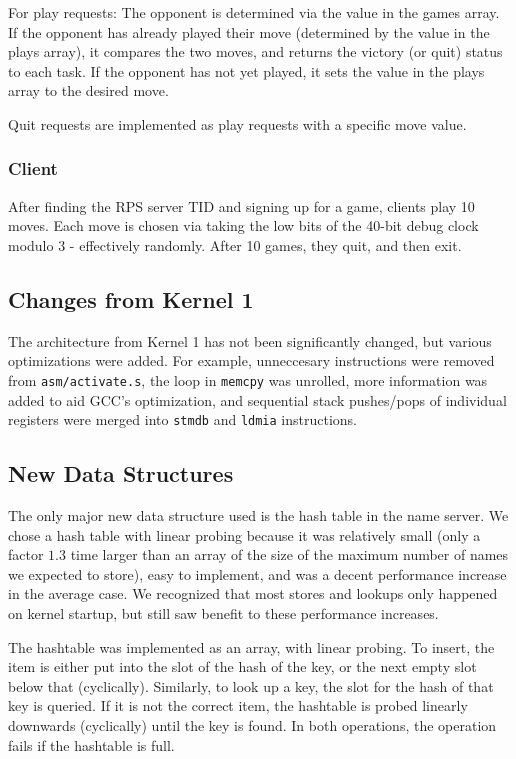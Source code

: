 \documentclass{article}
\begin{document}
   For play requests: The opponent is determined via the value in the games array.
   If the opponent has already played their move (determined by the value in the plays array), it compares the two moves, and returns the victory (or quit) status to each task. 
   If the opponent has not yet played, it sets the value in the plays array to the desired move.

   Quit requests are implemented as play requests with a specific move value.
\subsubsection{Client}
    After finding the RPS server TID and signing up for a game, clients play 10 moves. Each move is chosen via taking the low bits of the 40-bit debug clock modulo 3 - effectively randomly. After 10 games, they quit, and then exit.

\subsection{Changes from Kernel 1}
    The architecture from Kernel 1 has not been significantly changed, but various optimizations were added. For example, unneccesary instructions were removed from \verb|asm/activate.s|, the loop in \verb|memcpy| was unrolled, more information was added to aid GCC's optimization, and sequential stack pushes/pops of individual registers were merged into \verb|stmdb| and \verb|ldmia| instructions.
\subsection{New Data Structures}
    The only major new data structure used is the hash table in the name server. We chose a hash table with linear probing because it was relatively small (only a factor $1.3$ time larger than an array of the size of the maximum number of names we expected to store), easy to implement, and was a decent performance increase in the average case. We recognized that most stores and lookups only happened on kernel startup, but still saw benefit to these performance increases.

    The hashtable was implemented as an array, with linear probing. To insert, the item is either put into the slot of the hash of the key, or the next empty slot below that (cyclically).
    Similarly, to look up a key, the slot for the hash of that key is queried.
    If it is not the correct item, the hashtable is probed linearly downwards (cyclically) until the key is found.
    In both operations, the operation fails if the hashtable is full.
\end{document}
